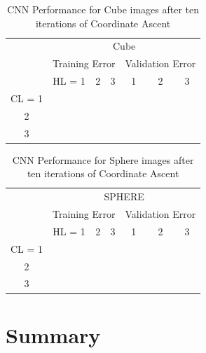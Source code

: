 \documentclass[journal]{IEEEtran}
\begin{document}
\begin{table}[h]
	\caption{CNN Performance for Cube images after ten iterations of Coordinate Ascent}
	\label{CNN_CUBE_TABLE}
	\centering
	\begin{tabular}{|c|c|c|c||c|c|c|}
		\cline{2-7}
		\multicolumn{1}{c|}{} &	\multicolumn{6}{c|}{Cube}\\\cline{2-7}
		\multicolumn{1}{c|}{}&\multicolumn{3}{|c||}{Training Error}  &\multicolumn{3}{c|}{Validation Error} \\
		\cline{2-7}
		\multicolumn{1}{c|}{} & HL = 1 & 2 & 3 &1 & 2 & 3 \\
		\hline
		CL = 1	& & & 	& & & \\
		2	& & & & & & \\
		3	& & & & &  & \\
		\hline
		
		
	\end{tabular}
\end{table}


\begin{table}[h]
	\caption{CNN Performance for Sphere images after ten iterations of Coordinate Ascent}
	\label{CNN_SPHERE_TABLE}
	\centering
	\begin{tabular}{|c|c|c|c||c|c|c|}
		\cline{2-7}
		\multicolumn{1}{c|}{} &	\multicolumn{6}{c|}{SPHERE}\\\cline{2-7}
		\multicolumn{1}{c|}{}&\multicolumn{3}{|c||}{Training Error}  &\multicolumn{3}{c|}{Validation Error} \\
		\cline{2-7}
		\multicolumn{1}{c|}{} & HL = 1 & 2 & 3 &1 & 2 & 3 \\
		\hline
		CL = 1	& & & 	& & & \\
		2	& & & & & & \\
		3	& & & & &  & \\
		\hline
		
		
	\end{tabular}
\end{table}


\section{Summary}
\end{document}

